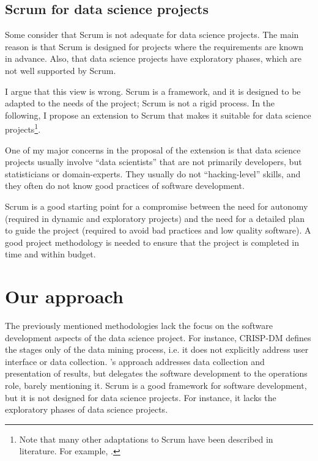 \subsection{Scrum for data science projects}

Some consider that Scrum is not adequate for data science projects.  The main reason is
that Scrum is designed for projects where the requirements are known in advance.  Also,
that data science projects have exploratory phases, which are not well supported by Scrum.

I argue that this view is wrong.  Scrum is a framework, and it is designed to be adapted to
the needs of the project;  Scrum is not a rigid process.  In the following, I propose an
extension to Scrum that makes it suitable for data science projects\footnote{Note that
many other adaptations to Scrum have been described in literature.  For example,
.}.

One of my major concerns in the proposal of the extension is that data science projects
usually involve ``data scientists'' that are not primarily developers, but statisticians or
domain-experts.  They usually do not ``hacking-level'' skills, and they often do not know
good practices of software development.

Scrum is a good starting point for a compromise between the need for autonomy (required in
dynamic and exploratory projects) and the need for a detailed plan to guide the project
(required to avoid bad practices and low quality software). A good project methodology is
needed to ensure that the project is completed in time and within budget.

\section{Our approach}

The previously mentioned methodologies lack the focus on the software development aspects of
the data science project.  For instance, CRISP-DM defines the stages only of the data
mining process, i.e. it does not explicitly address user interface or data collection.
\citeauthor{Zumel2019}'s approach addresses data collection and presentation of results, but
delegates the software development to the operations role, barely mentioning it.  Scrum is
a good framework for software development, but it is not designed for data science
projects.  For instance, it lacks the exploratory phases of data science projects.

